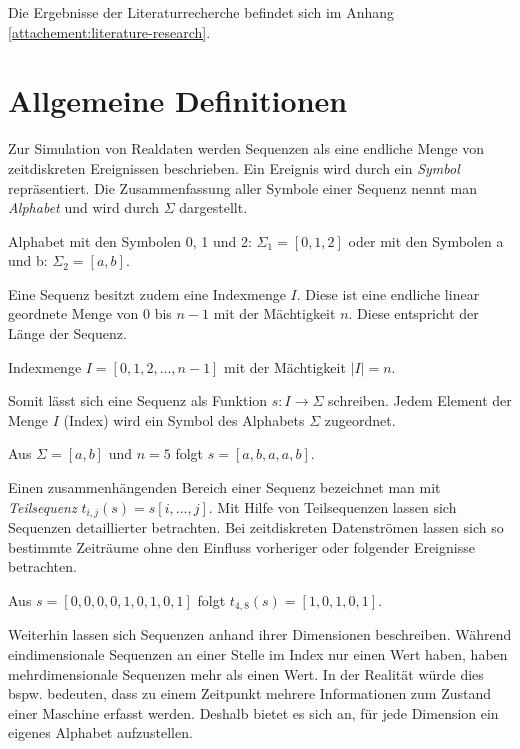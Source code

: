 Die Ergebnisse der Literaturrecherche befindet sich im Anhang \ref{attachement:literature-research}. 

\section{Allgemeine Definitionen}
\label{chp:definitions-sequences}
Zur Simulation von Realdaten werden Sequenzen als eine endliche Menge von zeitdiskreten Ereignissen beschrieben. Ein Ereignis wird durch ein \textit{Symbol} repräsentiert. Die Zusammenfassung aller  Symbole einer Sequenz nennt man \textit{Alphabet} und wird durch $\Sigma$ dargestellt.

\begin{theorem}
	Alphabet mit den Symbolen 0, 1 und 2: $\Sigma_1 = [0,1,2]$ oder mit den Symbolen a und b: $\Sigma_2 = [a,b]$. 
\end{theorem}

Eine Sequenz besitzt zudem eine Indexmenge $I$. Diese ist eine endliche linear geordnete Menge von 0 bis $n-1$ mit der Mächtigkeit $n$. Diese entspricht der Länge der Sequenz.

\begin{theorem}
	Indexmenge $I = [0,1,2,...,n-1]$ mit der Mächtigkeit $|I| = n$.
\end{theorem}

Somit lässt sich eine Sequenz als Funktion $s : I \rightarrow \Sigma$ schreiben. Jedem Element der Menge $I$ (Index) wird ein Symbol des Alphabets $\Sigma$ zugeordnet.

\begin{theorem}
	Aus $\Sigma = [a,b]$ und $n = 5$ folgt $s = [a,b,a,a,b]$.
\end{theorem}

Einen zusammenhängenden Bereich einer Sequenz bezeichnet man mit \textit{Teilsequenz} $t_{i,j}(s) = s[i,...,j]$. Mit Hilfe von Teilsequenzen lassen sich Sequenzen detaillierter betrachten. Bei zeitdiskreten Datenströmen lassen sich so bestimmte Zeiträume ohne den Einfluss vorheriger oder folgender Ereignisse betrachten. 

\begin{theorem}
	Aus $s = [0,0,0,0,1,0,1,0,1]$ folgt $t_{4,8}(s) = [1,0,1,0,1] $.
\end{theorem}

Weiterhin lassen sich Sequenzen anhand ihrer Dimensionen beschreiben. Während eindimensionale Sequenzen an einer Stelle im Index nur einen Wert haben, haben mehrdimensionale Sequenzen mehr als einen Wert. In der Realität würde dies bspw. bedeuten, dass zu einem Zeitpunkt mehrere Informationen zum Zustand einer Maschine erfasst werden. Deshalb bietet es sich an, für jede Dimension ein eigenes Alphabet aufzustellen.

